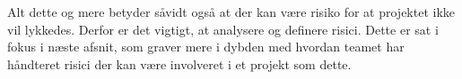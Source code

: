 Alt dette og mere %
betyder såvidt også at der kan være risiko for at projektet ikke vil lykkedes. Derfor er det vigtigt, at analysere og definere risici. Dette er sat i fokus i næste afsnit, som graver mere i dybden med hvordan teamet har håndteret risici der kan være involveret i et projekt som dette.
